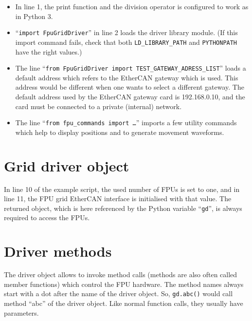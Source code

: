 \documentclass[fontsize=12,a4paper]{scrreprt}
\begin{document}
\begin{itemize}
\item In line 1, the print function and the division operator is
  configured to work as in Python 3.

\item ``\texttt{import FpuGridDriver}'' in line 2 loads the driver
  library module. (If this import command fails, check that both
  \verb+LD_LIBRARY_PATH+ and \verb+PYTHONPATH+ have the right values.)

\item The line ``\texttt{from FpuGridDriver import
  TEST\_GATEWAY\_ADRESS\_LIST}'' loads a default address which refers to
  the EtherCAN gateway which is used. This address would be different
  when one wants to select a different gateway. The default
  address used by the EtherCAN gateway card is 192.168.0.10,
  and the card must be connected to a private (internal) network.

\item The line ``\texttt{from fpu\_commands import \ldots}'' imports a
  few utility commands which help to display positions and to generate
  movement waveforms.


\end{itemize}

\section{Grid driver object}

In line 10 of the example script, the used number of FPUs is set to
one, and in line 11, the FPU grid EtherCAN interface is initialised with that
value. The returned object, which is here referenced by the Python variable
``\texttt{gd}'', is always required to access the FPUs.

\section{Driver methods}
The driver object allows to invoke method calls (methods are also
often called member functions) which control the FPU hardware. The
method names always start with a dot after the name of the driver
object.  So, \texttt{gd.abc()} would call method ``abc'' of the driver
object. Like normal function calls, they usually have parameters.
\end{document}

